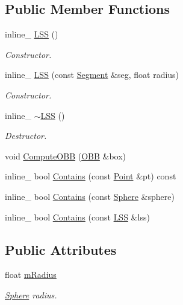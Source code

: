 \subsection*{Public Member Functions}
\begin{DoxyCompactItemize}
\item 
inline\+\_\+ \hyperlink{classLSS_a53df3c09d262024f461a2ee1f433b06c}{L\+SS} ()\hypertarget{classLSS_a53df3c09d262024f461a2ee1f433b06c}{}\label{classLSS_a53df3c09d262024f461a2ee1f433b06c}

\begin{DoxyCompactList}\small\item\em Constructor. \end{DoxyCompactList}\item 
inline\+\_\+ \hyperlink{classLSS_a171dd4bfc67cfd04f11bd22dd17fd536}{L\+SS} (const \hyperlink{classSegment}{Segment} \&seg, float radius)\hypertarget{classLSS_a171dd4bfc67cfd04f11bd22dd17fd536}{}\label{classLSS_a171dd4bfc67cfd04f11bd22dd17fd536}

\begin{DoxyCompactList}\small\item\em Constructor. \end{DoxyCompactList}\item 
inline\+\_\+ \hyperlink{classLSS_a044a4572cf4e2ff4b684e235ed87ffa0}{$\sim$\+L\+SS} ()\hypertarget{classLSS_a044a4572cf4e2ff4b684e235ed87ffa0}{}\label{classLSS_a044a4572cf4e2ff4b684e235ed87ffa0}

\begin{DoxyCompactList}\small\item\em Destructor. \end{DoxyCompactList}\item 
void \hyperlink{classLSS_a23bc306ab630c6badb301409562774ea}{Compute\+O\+BB} (\hyperlink{classOBB}{O\+BB} \&box)
\item 
inline\+\_\+ bool \hyperlink{classLSS_a52a11bc4815694cf9c8740ee4b1ba17b}{Contains} (const \hyperlink{classPoint}{Point} \&pt) const 
\item 
inline\+\_\+ bool \hyperlink{classLSS_a0937e7c07a6da4cae750d02a8b164499}{Contains} (const \hyperlink{classSphere}{Sphere} \&sphere)
\item 
inline\+\_\+ bool \hyperlink{classLSS_a60a0d4b412b9c1fe88e57cfd2e81d044}{Contains} (const \hyperlink{classLSS}{L\+SS} \&lss)
\end{DoxyCompactItemize}
\subsection*{Public Attributes}
\begin{DoxyCompactItemize}
\item 
float \hyperlink{classLSS_ad0c14a88b4dd17e7df3de6ff53c89fa9}{m\+Radius}\hypertarget{classLSS_ad0c14a88b4dd17e7df3de6ff53c89fa9}{}\label{classLSS_ad0c14a88b4dd17e7df3de6ff53c89fa9}

\begin{DoxyCompactList}\small\item\em \hyperlink{classSphere}{Sphere} radius. \end{DoxyCompactList}\end{DoxyCompactItemize}


